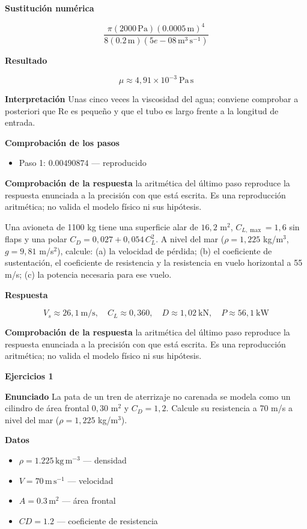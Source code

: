 \documentclass[10pt,openany]{book}
\begin{document}
\noindent\textbf{Sustitución numérica}

\[
\frac{\pi \left(2000\,\mathrm{Pa}\right) \left(0.0005\,\mathrm{m}\right)^{4}}{8 \left(0.2\,\mathrm{m}\right) \left(5e-08\,\mathrm{m}^{3}\,\mathrm{s}^{-1}\right)}
\]

\noindent\textbf{Resultado}

\[
\mu \approx 4{,}91\times 10^{-3}\ \mathrm{Pa\,s}
\]

\noindent\textbf{Interpretación}
Unas cinco veces la viscosidad del agua; conviene comprobar a posteriori que Re es pequeño y que el tubo es largo frente a la longitud de entrada.

\noindent\textbf{Comprobación de los pasos}
\begin{itemize}
\item Paso 1: $0.00490874$ — reproducido
\end{itemize}

\noindent\textbf{Comprobación de la respuesta} la aritmética del último paso reproduce la respuesta enunciada a la precisión con que está escrita. Es una reproducción aritmética; no valida el modelo físico ni sus hipótesis.

Una avioneta de 1100 kg tiene una superficie alar de \(16{,}2\) m\(^2\), \(C_{L,\max} = 1{,}6\) sin flaps y una polar \(C_D = 0{,}027 + 0{,}054\,C_L^{2}\). A nivel del mar (\(\rho = 1{,}225\) kg/m\(^3\), \(g = 9{,}81\) m/s\(^2\)), calcule: (a) la velocidad de pérdida; (b) el coeficiente de sustentación, el coeficiente de resistencia y la resistencia en vuelo horizontal a 55 m/s; (c) la potencia necesaria para ese vuelo.

\noindent\textbf{Respuesta}

\[
V_s \approx 26{,}1\ \mathrm{m/s},\quad C_L \approx 0{,}360,\quad D \approx 1{,}02\ \mathrm{kN},\quad P \approx 56{,}1\ \mathrm{kW}
\]

\noindent\textbf{Comprobación de la respuesta} la aritmética del último paso reproduce la respuesta enunciada a la precisión con que está escrita. Es una reproducción aritmética; no valida el modelo físico ni sus hipótesis.

\noindent\textbf{Ejercicios 1}

\noindent\textbf{Enunciado}
La pata de un tren de aterrizaje no carenada se modela como un cilindro de área frontal \(0{,}30\) m\(^2\) y \(C_D = 1{,}2\). Calcule su resistencia a 70 m/s a nivel del mar (\(\rho = 1{,}225\) kg/m\(^3\)).

\noindent\textbf{Datos}
\begin{itemize}
\item $\rho = 1.225\,\mathrm{kg}\,\mathrm{m}^{-3}$ — densidad
\item $V = 70\,\mathrm{m}\,\mathrm{s}^{-1}$ — velocidad
\item $A = 0.3\,\mathrm{m}^{2}$ — área frontal
\item $CD = 1.2$ — coeficiente de resistencia
\end{itemize}
\end{document}
